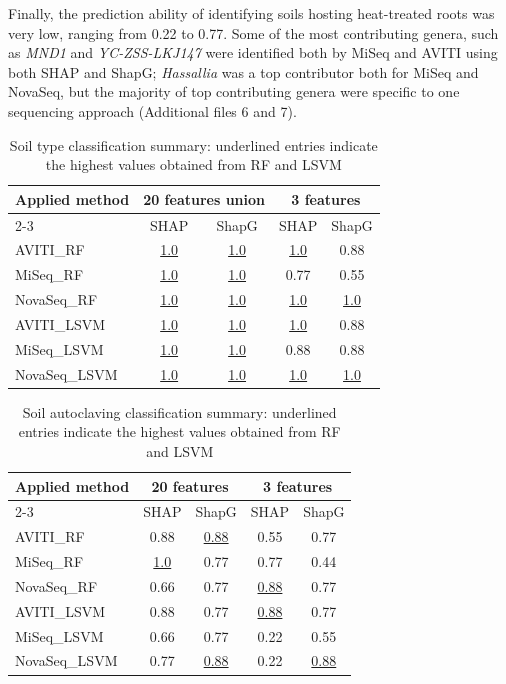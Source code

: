 \documentclass[12pt]{article}
\theoremstyle{thmstyleone}%
\theoremstyle{thmstyletwo}%
\theoremstyle{thmstylethree}%
\begin{document}
Finally, the prediction ability of identifying soils hosting heat-treated roots was very low, ranging from 0.22 to 0.77. Some of the most contributing genera, such as \textit{MND1} and \textit{YC-ZSS-LKJ147} were identified both by MiSeq and AVITI using both SHAP and ShapG; \textit{Hassallia} was a top contributor both for MiSeq and NovaSeq, but the majority of top contributing genera were specific to one sequencing approach (Additional files 6 and 7).






\begin{table}[htbp]
\caption{Soil type classification summary: underlined entries indicate the highest values obtained from RF and LSVM}\label{tab:model_performance1}%
\begin{tabular*}{\textwidth}{@{\extracolsep{\fill}}lcccc}
\toprule
\textbf{Applied method} & \multicolumn{2}{c}{\textbf{20 features union}} & \multicolumn{2}{c}{\textbf{3 features}} \\
\cmidrule{2-3} \cmidrule{4-5}
& SHAP & ShapG & SHAP & ShapG \\
\midrule
AVITI\_RF & \underline{1.0} & \underline{1.0} & \underline{1.0} & 0.88 \\
MiSeq\_RF & \underline{1.0} & \underline{1.0} & 0.77 & 0.55 \\
NovaSeq\_RF & \underline{1.0} & \underline{1.0} & \underline{1.0} & \underline{1.0} \\
\midrule
AVITI\_LSVM & \underline{1.0} & \underline{1.0} & \underline{1.0} & 0.88 \\
MiSeq\_LSVM & \underline{1.0} & \underline{1.0} & 0.88 & 0.88 \\
NovaSeq\_LSVM & \underline{1.0} & \underline{1.0} & \underline{1.0} & \underline{1.0} \\
\hline
\end{tabular*}
\end{table}


\begin{table}[htbp]
\caption{Soil autoclaving classification summary: underlined entries indicate the highest values obtained from RF and LSVM}\label{tab:model_performance2}%
\begin{tabular*}{\textwidth}{@{\extracolsep{\fill}}lcccc}
\toprule
\textbf{Applied method} & \multicolumn{2}{c}{\textbf{20 features}} & \multicolumn{2}{c}{\textbf{3 features}} \\
\cmidrule{2-3} \cmidrule{4-5}
& SHAP & ShapG & SHAP & ShapG \\
\midrule
AVITI\_RF & 0.88 & \underline{0.88} & 0.55 & 0.77 \\
MiSeq\_RF & \underline{1.0} & 0.77 & 0.77 & 0.44 \\
NovaSeq\_RF & 0.66 & 0.77 & \underline{0.88} & 0.77 \\
\midrule
AVITI\_LSVM & 0.88 & 0.77 & \underline{0.88} & 0.77 \\
MiSeq\_LSVM & 0.66 & 0.77 & 0.22 & 0.55 \\
NovaSeq\_LSVM & 0.77 & \underline{0.88} & 0.22 & \underline{0.88} \\
\hline
\end{tabular*}
\end{table}
\end{document}
